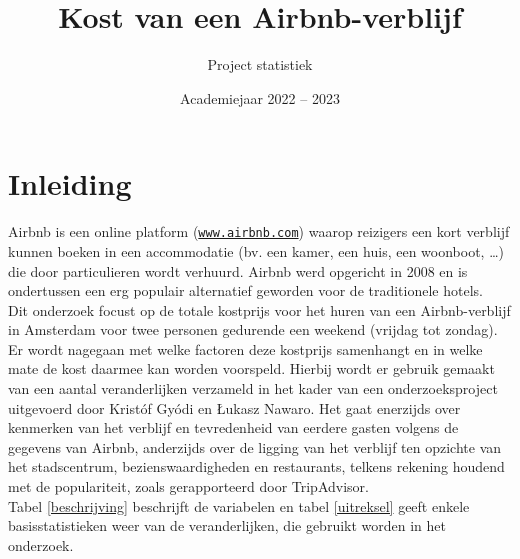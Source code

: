 \documentclass[a4paper]{kulakarticle}
\title{Kost van een Airbnb-verblijf}
\author{Project statistiek}
\date{Academiejaar 2022 -- 2023}
\begin{document}
	\maketitle
	\section*{Inleiding}
	Airbnb is een online platform (\href{https://www.airbnb.com}{\texttt{www.airbnb.com}}) waarop reizigers een kort verblijf kunnen boeken in een accommodatie (bv. een kamer, een huis, een woonboot, …) die door particulieren wordt verhuurd. Airbnb werd opgericht in 2008 en is ondertussen een erg populair alternatief geworden voor de traditionele hotels. \\
	
	Dit onderzoek focust op de totale kostprijs voor het huren van een Airbnb-verblijf in Amsterdam voor twee personen gedurende een weekend (vrijdag tot zondag). Er wordt nagegaan met welke factoren deze kostprijs samenhangt en in welke mate de kost daarmee kan worden voorspeld. Hierbij wordt er gebruik gemaakt van een aantal veranderlijken verzameld in het kader van een onderzoeksproject uitgevoerd door Kristóf Gyódi en Łukasz Nawaro. Het gaat enerzijds over kenmerken van het verblijf en tevredenheid van eerdere gasten volgens de gegevens van Airbnb, anderzijds over de ligging van het verblijf ten opzichte van het stadscentrum, bezienswaardigheden en restaurants, telkens rekening houdend met de populariteit, zoals gerapporteerd door TripAdvisor.\\
	
	Tabel \ref{beschrijving} beschrijft de variabelen en tabel \ref{uitreksel} geeft enkele basisstatistieken weer van de veranderlijken, die gebruikt worden in het onderzoek. \\\\
\end{document}
